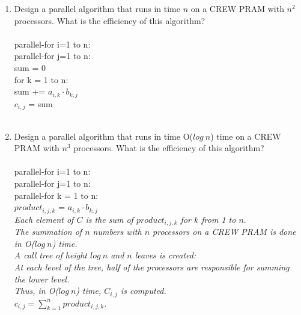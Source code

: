 \documentclass[10pt]{article}
\newcommand{\tab}{\hspace*{2em}}
\newcommand{\tabb}{\hspace*{4em}}
\newcommand{\tabbb}{\hspace*{6em}}
\begin{document}
\begin{enumerate}
\item Design a parallel algorithm that runs in time $n$ on a CREW PRAM with $n^2$
processors. What is the efficiency of this algorithm?\\
\\
parallel-for i=1 to n:\\
\tab parallel-for j=1 to n:\\
\tabb sum = 0\\
\tabb for k = 1 to n:\\
\tabbb sum += $a_{i,k} \cdot b_{k,j}$\\
\tabb $c_{i,j}$ = sum\\
\\

\item Design a parallel algorithm that runs in time O($log~n$) time on a CREW PRAM with $n^3$
processors. What is the efficiency of this algorithm?\\
\\
parallel-for i=1 to n:\\
\tab parallel-for j=1 to n:\\
\tabb parallel-for k = 1 to n:\\
\tabbb $product_{i,j,k}$ = $a_{i,k} \cdot b_{k,j}$\\
\tabb \emph{Each element of $C$ is the sum of $product_{i,j,k}$ for $k$ from 1 to $n$}.\\
\tabb \emph{The summation of $n$ numbers with $n$ processors on a CREW PRAM is done in O($log~n$) time.}\\
\tabb \emph{A call tree of height $log~n$ and $n$ leaves is created:}\\
\tabb \emph{At each level of the tree, half of the processors are responsible for summing the lower level.}\\
\tabb \emph{Thus, in O($log~n$) time, $C_{i,j}$ is computed.}\\
\tabb $c_{i,j} = \sum_{k=1}^{n}product_{i,j,k}$.\\
\\


\end{enumerate}
\end{document}
